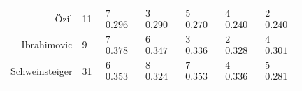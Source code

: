 \documentclass[10pt, a4paper]{UUThesisTemplate}
\begin{document}
\begin{table}[hb]
\begin{tabular}{r l c c c c c}
Özil & 11 & $\begin{matrix} \text{7} \\ 0.296 \end{matrix}$  & $\begin{matrix} \text{3} \\ 0.290 \end{matrix}$  & $\begin{matrix} \text{5} \\ 0.270 \end{matrix}$  & $\begin{matrix} \text{4} \\ 0.240 \end{matrix}$  & $\begin{matrix} \text{2} \\ 0.240 \end{matrix}$\\
Ibrahimovic & 9 & $\begin{matrix} \text{7} \\ 0.378 \end{matrix}$  & $\begin{matrix} \text{6} \\ 0.347 \end{matrix}$  & $\begin{matrix} \text{3} \\ 0.336 \end{matrix}$  & $\begin{matrix} \text{2} \\ 0.328 \end{matrix}$  & $\begin{matrix} \text{4} \\ 0.301 \end{matrix}$\\
Schweinsteiger & 31 & $\begin{matrix} \text{6} \\ 0.353 \end{matrix}$  & $\begin{matrix} \text{8} \\ 0.324 \end{matrix}$  & $\begin{matrix} \text{7} \\ 0.353 \end{matrix}$  & $\begin{matrix} \text{4} \\ 0.336 \end{matrix}$  & $\begin{matrix} \text{5} \\ 0.281 \end{matrix}$\\

\end{tabular}
\end{table}
\end{document}
